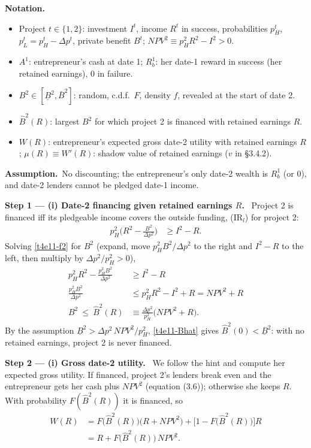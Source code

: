 \documentclass[11pt,a4paper]{article}
\newcommand{\notation}{\par\noindent\textbf{Notation.}}
\newcommand{\step}[2]{\par\medskip\noindent\textbf{Step #1 --- #2.}~}
\newcommand{\assume}{\par\smallskip\noindent\textbf{Assumption.}~}
\begin{document}
\notation
\begin{itemize}
  \item Project $t\in\{1,2\}$: investment $I^t$, income $R^t$ in success, probabilities $p_H^t$,
        $p_L^t=p_H^t-\Delta p^t$, private benefit $B^t$; $\mathit{NPV}^2\equiv p_H^2R^2-I^2>0$.
  \item $A^1$: entrepreneur's cash at date 1; $R_b^1$: her date-1 reward in success (her retained
        earnings), $0$ in failure.
  \item $B^2\in[\underline B^2,\bar B^2]$: random, c.d.f.\ $F$, density $f$, revealed at the start of date 2.
  \item $\hat B^2(R)$: largest $B^2$ for which project 2 is financed with retained earnings $R$.
  \item $W(R)$: entrepreneur's expected gross date-2 utility with retained earnings $R$; $\mu(R)\equiv W'(R)$:
        shadow value of retained earnings ($v$ in \S3.4.2).
\end{itemize}
\assume No discounting; the entrepreneur's only date-2 wealth is $R_b^1$ (or $0$), and date-2 lenders
cannot be pledged date-1 income.

\step{1}{(i) Date-2 financing given retained earnings $R$} Project 2 is financed iff its pledgeable
income covers the outside funding, (IR$_l$) for project 2:
\begin{align}
  p_H^2\Big(R^2-\frac{B^2}{\Delta p^2}\Big) &\ge I^2-R. \label{t4e11-f2}
\end{align}
Solving \eqref{t4e11-f2} for $B^2$ (expand, move $p_H^2B^2/\Delta p^2$ to the right and $I^2-R$ to
the left, then multiply by $\Delta p^2/p_H^2>0$),
\begin{align}
  p_H^2R^2-\frac{p_H^2B^2}{\Delta p^2} &\ge I^2-R \nonumber\\
  \frac{p_H^2B^2}{\Delta p^2} &\le p_H^2R^2-I^2+R=\mathit{NPV}^2+R \nonumber\\
  B^2\ \le\ \hat B^2(R) &\equiv \frac{\Delta p^2}{p_H^2}\big(\mathit{NPV}^2+R\big). \label{t4e11-Bhat}
\end{align}
By the assumption $\underline B^2>\Delta p^2\,\mathit{NPV}^2/p_H^2$, \eqref{t4e11-Bhat} gives
$\hat B^2(0)<\underline B^2$: with no retained earnings, project 2 is never financed.

\step{2}{(i) Gross date-2 utility} We follow the hint and compute her expected gross utility. If
financed, project 2's lenders break even and the entrepreneur gets her cash plus $\mathit{NPV}^2$
(equation (3.6)); otherwise she keeps $R$. With probability $F(\hat B^2(R))$ it is financed, so
\begin{align}
  W(R) &= F\big(\hat B^2(R)\big)\big(R+\mathit{NPV}^2\big)+\Big[1-F\big(\hat B^2(R)\big)\Big]R \nonumber\\
       &= R+F\big(\hat B^2(R)\big)\,\mathit{NPV}^2. \label{t4e11-W}
\end{align}
\end{document}
